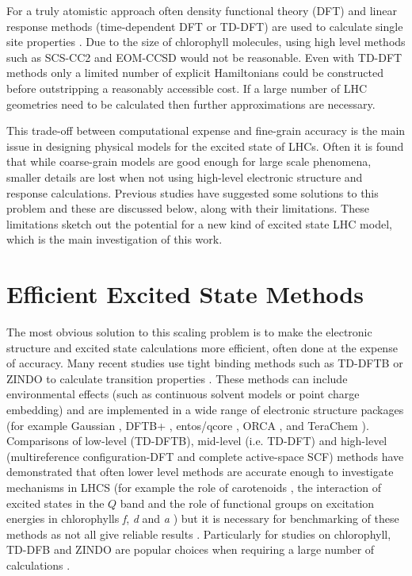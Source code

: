 For a truly atomistic approach often density functional theory (DFT) and linear 
response methods (time-dependent DFT or TD-DFT) are used to calculate single site
properties \cite{Cignoni2022}. Due to the size of chlorophyll molecules, using high
level methods such as SCS-CC2 and EOM-CCSD would not be reasonable. Even with TD-DFT
methods only a limited number of explicit Hamiltonians could be constructed before
outstripping a reasonably accessible cost. If a large number of LHC geometries need 
to be calculated then further approximations are necessary.

This trade-off between computational expense and fine-grain accuracy is the main
issue in designing physical models for the excited state of LHCs. Often it is found
that while coarse-grain models are good enough for large scale phenomena, smaller
details are lost when not using high-level electronic structure and response calculations.
Previous studies have suggested some solutions to this problem and these are discussed
below, along with their limitations. These limitations sketch out the potential 
for a new kind of excited state LHC model, which is the main investigation of this
work.

\section{Efficient Excited State Methods}
\label{sec:efficient_response_methods}

The most obvious solution to this scaling problem is to make the electronic structure 
and excited state calculations more efficient, often done at the expense of accuracy.
Many recent studies use tight binding methods such as TD-DFTB or ZINDO to calculate
transition properties \cite{Jurinovich2015, Olbrich2010, Curutchet2011, Curutchet2012}. 
These methods can include environmental effects (such as continuous solvent models 
or point charge embedding) and are implemented in a wide range of electronic structure
packages (for example Gaussian \cite{Gaussian16}, DFTB+ \cite{Hourahine2020}, entos/qcore \cite{Manby2019},
ORCA \cite{Neese2012, Neese2018}, and TeraChem \cite{Seritan2020, Seritan2021}). 
Comparisons of low-level (TD-DFTB), mid-level (i.e. TD-DFT) and high-level (multireference
configuration-DFT and complete active-space SCF) methods have demonstrated that 
often lower level methods are accurate enough to investigate mechanisms in LHCS
(for example the role of carotenoids \cite{Andreussi2015}, the interaction of excited
states in the $Q$ band \cite{Hansen2019} and the role of functional groups on excitation
energies in chlorophylls \emph{f}, \emph{d} and \emph{a} \cite{Poddubnyy2021}) but
it is necessary for benchmarking of these methods as not all give reliable results \cite{Dahlbom2005}.
Particularly for studies on chlorophyll, TD-DFB and ZINDO are popular choices when
requiring a large number of calculations \cite{Cignoni2022}.

